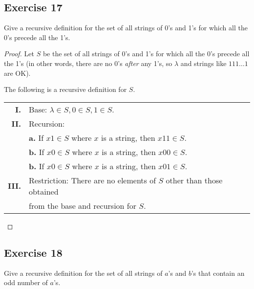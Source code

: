 \documentclass[14pt]{extarticle}
\begin{document}
\subsection{Exercise 17}
Give a recursive definition for the set of all strings of 0’s and 1’s for which all the 0’s precede all the 1’s.

\begin{proof}
    Let $S$ be the set of all strings of 0’s and 1’s for which all the 0’s precede all the 1’s (in other words, there are
    no 0's {\it after} any 1's, so $\lambda$ and strings like $111\ldots 1$ are OK).

    The following is a recursive definition for $S$.

    \begin{tabular}{rl}
        {\bf I.}   & Base: \(\lambda \in S, 0 \in S, 1 \in S\).                          \\
        {\bf II.}  & Recursion:                                                          \\
                   & {\bf a.} If $x1 \in S$ where $x$ is a string, then $x11 \in S$.     \\
                   & {\bf b.} If $x0 \in S$ where $x$ is a string, then $x00 \in S$.     \\
                   & {\bf b.} If $x0 \in S$ where $x$ is a string, then $x01 \in S$.     \\
        {\bf III.} & Restriction: There are no elements of $S$ other than those obtained \\
                   & from the base and recursion for $S$.
    \end{tabular}
\end{proof}

\subsection{Exercise 18}
Give a recursive definition for the set of all strings of $a$’s and $b$’s that contain an odd number of $a$’s.
\end{document}
